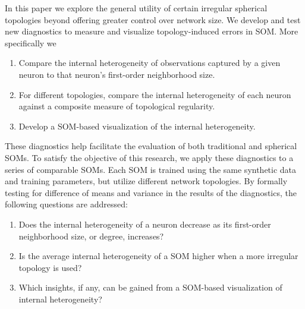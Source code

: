 In this paper we explore the general utility of certain irregular spherical
topologies beyond offering greater control over network size. We develop and
test new diagnostics to measure and visualize topology-induced errors in SOM.
More specifically we 

\begin{enumerate}
\item Compare the internal heterogeneity of observations captured by a given neuron to that neuron's first-order neighborhood size.
\item For different topologies, compare the internal heterogeneity of each neuron against a composite measure of topological regularity.
\item Develop a SOM-based visualization of the internal heterogeneity.
\end{enumerate}

These diagnostics help facilitate the evaluation of both traditional and
spherical SOMs. To satisfy the objective of this research, we apply these
diagnostics to a series of comparable SOMs. Each SOM is trained using the
same synthetic data and training parameters, but utilize different network
topologies. By formally testing for difference of means and variance in the
results of the diagnostics, the following questions are addressed:

\begin{enumerate}
\item Does the internal heterogeneity of a neuron decrease as its first-order neighborhood size, or degree, increases?
\item Is the average internal heterogeneity of a SOM higher when a more irregular topology is used?
\item Which insights, if any, can be gained from a SOM-based visualization of internal heterogeneity?
\end{enumerate}

